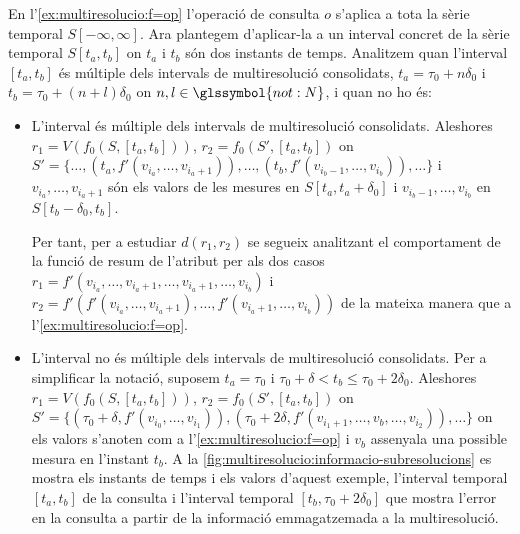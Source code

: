 \begin{example}
\label{ex:multireoslucio:informacio-subresolucions}

En l'\autoref{ex:multiresolucio:f=op} l'operació de consulta $o$
s'aplica a tota la sèrie temporal $S[-\infty,\infty]$. Ara plantegem
d'aplicar-la a un interval concret de la sèrie temporal $S[t_a,t_b]$
on $t_a$ i $t_b$ són dos instants de temps.  Analitzem quan l'interval
$[t_a,t_b]$ és múltiple dels intervals de multiresolució consolidats,
$t_a=\tau_0+n\delta_0$ i $t_b=\tau_0+(n+l)\delta_0$ on
$n,l\in\glssymbol{not:N}$, i quan no ho és:

\begin{itemize}
\item L'interval és múltiple dels intervals de multiresolució
  consolidats. Aleshores $r_1=V(f_0(S,[t_a,t_b]))$,
  $r_2=f_0(S',[t_a,t_b])$ on $S'= \{ \dotsc, (t_a,
  f'(v_{i_a},\dotsc,v_{i_a+1}) ), \dotsc, (t_b,
  f'(v_{i_b-1},\dotsc,v_{i_b})), \dotsc \}$ i
  $v_{i_a},\dotsc,v_{i_a+1}$ són els valors de les mesures en
  $S[t_a,t_a+\delta_0]$ i $v_{i_b-1},\dotsc,v_{i_b}$ en
  $S[t_b-\delta_0,t_b]$.

  Per tant, per a estudiar $d(r_1,r_2)$ se segueix analitzant el
  comportament de la funció de resum de l'atribut per als dos casos
  $r_1=f'(v_{i_a},\dotsc,v_{i_a+1},\dotsc, v_{i_a+1},\dotsc,v_{i_b})$
  i $r_2=f'(f'(v_{i_a},\dotsc,v_{i_a+1}),\dotsc,
  f'(v_{i_a+1},\dotsc,v_{i_b}))$ de la mateixa manera que a 
  l'\autoref{ex:multiresolucio:f=op}.


\item L'interval no és múltiple dels intervals de multiresolució
  consolidats.  Per a simplificar la notació, suposem $t_a=\tau_0$ i
  $\tau_0+\delta < t_b \leq \tau_0+2\delta_0$.  Aleshores
  $r_1=V(f_0(S,[t_a,t_b]))$, $r_2=f_0(S',[t_a,t_b])$ on $S'=
  \{(\tau_0+\delta, f'(v_{i_0},\dotsc,v_{i_1}) ),(\tau_0+2\delta ,
  f'(v_{i_1+1},\dotsc,v_{b} ,\dotsc,v_{i_2})), \dotsc \}$ on els
  valors s'anoten com a l'\autoref{ex:multiresolucio:f=op} i $v_b$
  assenyala una possible mesura en l'instant $t_b$.  A la
  \autoref{fig:multiresolucio:informacio-subresolucions} es mostra els
  instants de temps i els valors d'aquest exemple, l'interval
  temporal $[t_a,t_b]$ de la consulta i l'interval temporal
  $[t_b,\tau_0+2\delta_0]$ que mostra l'error en la consulta a partir
  de la informació emmagatzemada a la multiresolució.


\begin{figure}[tp]
  \centering
\end{figure}
\end{itemize}
\end{example}
